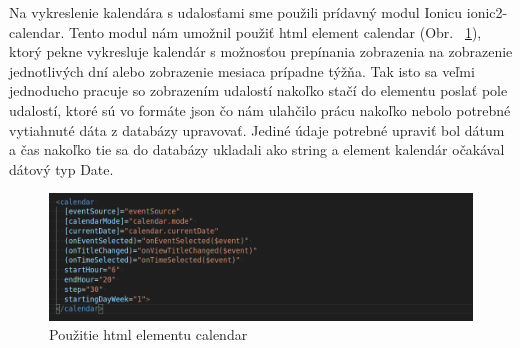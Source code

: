 \indent Na vykreslenie kalendára s udalosťami sme použili prídavný modul Ionicu ionic2-calendar. Tento modul nám umožnil použiť html element calendar (Obr. ~\ref{fig:calendar}), ktorý pekne vykresluje kalendár s možnosťou prepínania zobrazenia na zobrazenie jednotlivých dní alebo zobrazenie mesiaca prípadne týžňa. Tak isto sa veľmi jednoducho pracuje so zobrazením udalostí nakoľko stačí do elementu poslať pole udalostí, ktoré sú vo formáte json čo nám ulahčilo prácu nakoľko nebolo potrebné vytiahnuté dáta z databázy upravovať. Jediné údaje potrebné upraviť bol dátum a čas nakoľko tie sa do databázy ukladali ako string a element kalendár očakával dátový typ Date.

\begin{figure}[H]
    \centering
    \includegraphics[scale=0.45]{img/imp/calendar_user.png}
    \caption{Použitie html elementu calendar}
    \label{fig:calendar}
\end{figure}